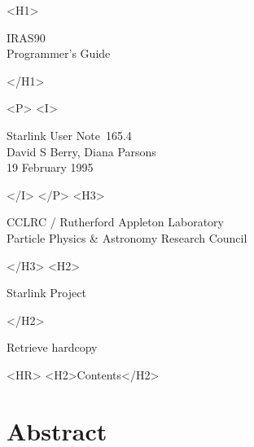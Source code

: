 \documentclass[twoside,11pt]{article}
\newcommand{\stardoccategory}  {Starlink User Note}
\newcommand{\stardocsource}    {sun\stardocnumber}
\newcommand{\stardocnumber}    {165.4}
\newcommand{\stardocauthors}   {David S Berry, Diana Parsons}
\newcommand{\stardocdate}      {19 February 1995}
\newcommand{\stardoctitle}     {IRAS90\\[2ex]
                               Programmer's Guide}
\newcommand{\htmladdnormallink}[2]{#1}
\newcommand{\htmladdimg}[1]{}
\newcommand{\htmlref}[2]{#1}
\newcommand{\htmladdtonavigation}[1]{}
\newcommand{\xlabel}[1]{}
\begin{document}
\begin{htmlonly}
   \xlabel{}
   \begin{rawhtml} <H1> \end{rawhtml}
      \stardoctitle
   \begin{rawhtml} </H1> \end{rawhtml}


   \begin{rawhtml} <P> <I> \end{rawhtml}
   \stardoccategory\ \stardocnumber \\
   \stardocauthors \\
   \stardocdate
   \begin{rawhtml} </I> </P> <H3> \end{rawhtml}
      \htmladdnormallink{CCLRC}{http://www.cclrc.ac.uk} /
      \htmladdnormallink{Rutherford Appleton Laboratory}
                        {http://www.cclrc.ac.uk/ral} \\
      \htmladdnormallink{Particle Physics \& Astronomy Research Council}
                        {http://www.pparc.ac.uk} \\
   \begin{rawhtml} </H3> <H2> \end{rawhtml}
      \htmladdnormallink{Starlink Project}{http://www.starlink.ac.uk/}
   \begin{rawhtml} </H2> \end{rawhtml}
   \htmladdnormallink{\htmladdimg{source.gif} Retrieve hardcopy}
      {http://www.starlink.ac.uk/cgi-bin/hcserver?\stardocsource}\\

  \label{stardoccontents}
  \begin{rawhtml}
    <HR>
    <H2>Contents</H2>
  \end{rawhtml}
  \htmladdtonavigation{\htmlref{\htmladdimg{contents_motif.gif}}
        {stardoccontents}}

  \section{\xlabel{abstract}Abstract}
\end{htmlonly}
\end{document}

